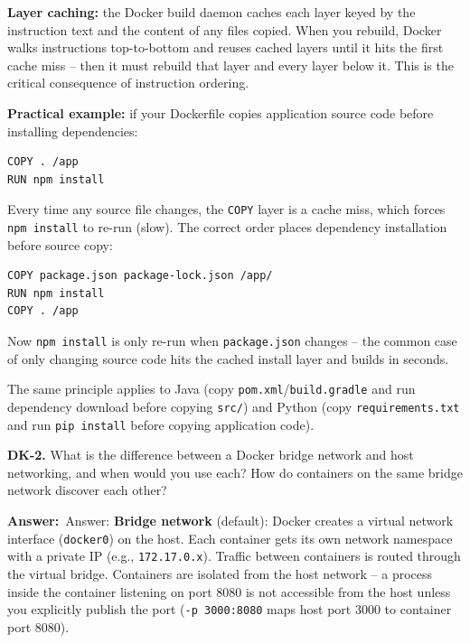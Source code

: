 \documentclass[letterpaper,10pt]{article}
\newlength{\boxwidth}
\newcommand{\answerlabel}{\noindent\textbf{\textcolor{answerblue}{Answer:}}~}
\begin{document}
\textbf{Layer caching:} the Docker build daemon caches each layer keyed by the instruction text and the content of any files copied. When you rebuild, Docker walks instructions top-to-bottom and reuses cached layers until it hits the first cache miss -- then it must rebuild that layer and every layer below it. This is the critical consequence of instruction ordering.

\textbf{Practical example:} if your Dockerfile copies application source code before installing dependencies:
\begin{lstlisting}[]
COPY . /app
RUN npm install
\end{lstlisting}
Every time any source file changes, the \texttt{COPY} layer is a cache miss, which forces \texttt{npm install} to re-run (slow). The correct order places dependency installation before source copy:
\begin{lstlisting}[]
COPY package.json package-lock.json /app/
RUN npm install
COPY . /app
\end{lstlisting}
Now \texttt{npm install} is only re-run when \texttt{package.json} changes -- the common case of only changing source code hits the cached install layer and builds in seconds.

The same principle applies to Java (copy \texttt{pom.xml}/\texttt{build.gradle} and run dependency download before copying \texttt{src/}) and Python (copy \texttt{requirements.txt} and run \texttt{pip install} before copying application code).

\vspace{6pt}

\colorbox{qbg}{\begin{minipage}{\boxwidth}
\textbf{DK-2.} What is the difference between a Docker bridge network and host networking, and when would you use each? How do containers on the same bridge network discover each other?
\end{minipage}}

\vspace{2pt}
\answerlabel{Answer:} \textbf{Bridge network} (default): Docker creates a virtual network interface (\texttt{docker0}) on the host. Each container gets its own network namespace with a private IP (e.g., \texttt{172.17.0.x}). Traffic between containers is routed through the virtual bridge. Containers are isolated from the host network -- a process inside the container listening on port 8080 is not accessible from the host unless you explicitly publish the port (\texttt{-p 3000:8080} maps host port 3000 to container port 8080).
\end{document}
